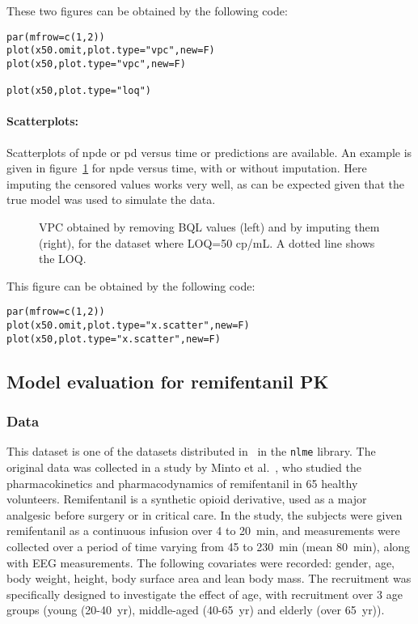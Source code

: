 These two figures can be obtained by the following code:
\begin{verbatim}
par(mfrow=c(1,2))
plot(x50.omit,plot.type="vpc",new=F)
plot(x50,plot.type="vpc",new=F)

plot(x50,plot.type="loq")
\end{verbatim} 

\clearpage
\paragraph{Scatterplots:} Scatterplots of npde or pd versus time or predictions are available. An example is given in figure~\ref{fig:x50.xscatter} for npde versus time, with or without imputation. Here imputing the censored values works very well, as can be expected given that the true model was used to simulate the data.

\begin{figure}[!h]
\par\kern -1cm
\begin{center}
\end{center}
\par\kern -7cm
\caption{VPC obtained by removing BQL values (left) and by imputing them (right), for the dataset where LOQ=50 cp/mL. A dotted line shows the LOQ.}\label{fig:x50.xscatter}
\end{figure}

This figure can be obtained by the following code:
\begin{verbatim}
par(mfrow=c(1,2))
plot(x50.omit,plot.type="x.scatter",new=F)
plot(x50,plot.type="x.scatter",new=F)
\end{verbatim} 

\clearpage
\subsection{Model evaluation for remifentanil PK} \label{sec:remifentanil}

\subsubsection{Data}

\hskip 18pt This dataset is one of the datasets distributed in \R~in the \texttt{nlme} library. The original data was collected in a study by Minto et al.~\cite{Minto97a,Minto97b}, who studied the pharmacokinetics and pharmacodynamics of remifentanil in 65 healthy volunteers. Remifentanil is a synthetic opioid derivative, used as a major analgesic before surgery or in critical care. In the study, the subjects were given remifentanil as a continuous infusion over 4 to 20~min, and measurements were collected over a period of time varying from 45 to 230~min (mean 80~min), along with EEG measurements. The following covariates were recorded: gender, age, body weight, height, body surface area and lean body mass. The recruitment was specifically designed to investigate the effect of age, with recruitment over 3 age groups (young (20-40~yr), middle-aged (40-65~yr) and elderly (over 65~yr)).

